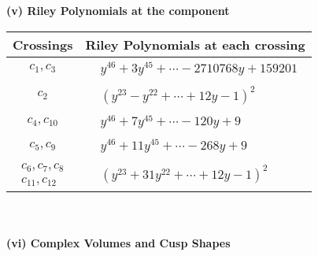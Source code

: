 \documentclass[1p]{elsarticle_modified}
\theoremstyle{definition}
\begin{document}
\newpage\renewcommand{\arraystretch}{1}
\flushleft \textbf{(v) Riley Polynomials at the component}\newline \\
\begin{tabular}{m{50pt}|m{274pt}}
Crossings & \hspace{64pt}Riley Polynomials at each crossing \\
\hline $$\begin{aligned}c_{1},c_{3}\end{aligned}$$&$\begin{aligned}
&y^{46}+3 y^{45}+\cdots-2710768 y+159201
\end{aligned}$\\
\hline $$\begin{aligned}c_{2}\end{aligned}$$&$\begin{aligned}
&(y^{23}- y^{22}+\cdots+12 y-1)^{2}
\end{aligned}$\\
\hline $$\begin{aligned}c_{4},c_{10}\end{aligned}$$&$\begin{aligned}
&y^{46}+7 y^{45}+\cdots-120 y+9
\end{aligned}$\\
\hline $$\begin{aligned}c_{5},c_{9}\end{aligned}$$&$\begin{aligned}
&y^{46}+11 y^{45}+\cdots-268 y+9
\end{aligned}$\\
\hline $$\begin{aligned}c_{6},c_{7},c_{8}\\c_{11},c_{12}\end{aligned}$$&$\begin{aligned}
&(y^{23}+31 y^{22}+\cdots+12 y-1)^{2}
\end{aligned}$\\
\hline
\end{tabular}\\~\\
\newpage\flushleft \textbf{(vi) Complex Volumes and Cusp Shapes}
\end{document}
